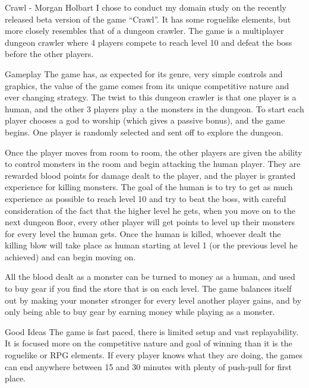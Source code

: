 \documentclass[12pt]{report}
\begin{document}
\begin{section}{Crawl - Morgan Holbart}
I chose to conduct my domain study on the recently released beta version
of the game ``Crawl''. It has some roguelike elements, but more closely
resembles that of a dungeon crawler. The game is a multiplayer dungeon
crawler where 4 players compete to reach level 10 and defeat the boss
before the other players. 

\begin{subsection}{Gameplay}
The game has, as expected for its genre, very simple controls and graphics,
the value of the game comes from its unique competitive nature and ever
changing strategy. The twist to this dungeon crawler is that one player
is a human, and the other 3 players play a the monsters in the dungeon. To
start each player chooses a god to worship (which gives a passive bonus),
and the game begins. One player is randomly selected and sent off to
explore the dungeon.

Once the player moves from room to room, the other players are given the
ability to control monsters in the room and begin attacking the human
player. They are rewarded blood points for damage dealt to the player, and
the player is granted experience for killing monsters. The goal of the
human is to try to get as much experience as possible to reach level 10
and try to beat the boss, with careful consideration of the fact that the
higher level he gets, when you move on to the next dungeon floor, every
other player will get points to level up their monsters for every level
the human gets. Once the human is killed, whoever dealt the killing blow
will take place as human starting at level 1 (or the previous level he
achieved) and can begin moving on.

All the blood dealt as a monster can be turned to money as a human, and
used to buy gear if you find the store that is on each level. The game
balances itself out by making your monster stronger for every level
another player gains, and by only being able to buy gear by earning money
while playing as a monster.
\end{subsection}

\begin{subsection}{Good Ideas}
The game is fast paced, there is limited setup and vast replayability. It
is focused more on the competitive nature and goal of winning than it is
the roguelike or RPG elements. If every player knows what they are doing,
the games can end anywhere between 15 and 30 minutes with plenty of
push-pull for first place.


\end{subsection}
\end{section}
\end{document}
